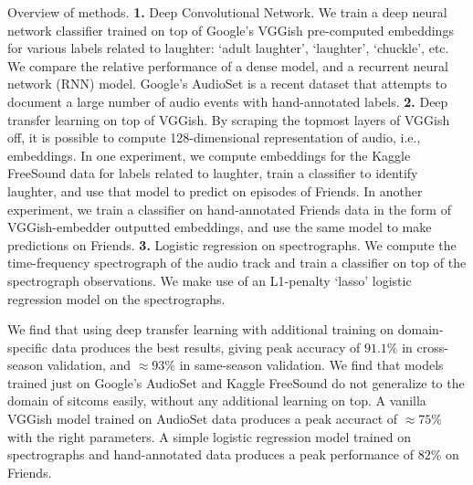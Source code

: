 \documentclass[12pt]{article}
\begin{document}
Overview of methods.
    \textbf{1.}
    Deep Convolutional Network. %
    We train a deep neural network classifier trained on top of Google's VGGish
        pre-computed embeddings for various labels related to laughter: `adult laughter',
    `laughter', `chuckle', etc. We compare the relative performance of a dense model,
        and a recurrent neural network (RNN) model.
    Google's AudioSet is a recent dataset that attempts to document a large number
        of audio events with hand-annotated labels.
    \textbf{2.}
    Deep transfer learning on top of VGGish.
    By scraping the topmost layers of VGGish off, it is possible to compute
        128-dimensional representation of audio, i.e., embeddings. 
        In one experiment,
        we compute embeddings for the Kaggle FreeSound data for labels related to laughter,
        train a classifier to identify laughter, and use that model to predict on episodes
        of Friends.
        In another experiment, we train a classifier on hand-annotated Friends data
        in the form of VGGish-embedder outputted embeddings, and use
        the same model to make predictions on Friends.
        \textbf{3.}
        Logistic regression on spectrographs.
        We compute the time-frequency spectrograph of the audio track and train
        a classifier on top of the spectrograph observations. We make use of an
        L1-penalty `lasso' logistic regression model on the spectrographs.

We find that using deep transfer learning with additional training on domain-specific data
produces the best results, giving peak accuracy of $91.1\%$ in cross-season validation, and
$\approx 93\%$ in same-season validation.
We find that models trained just on Google's AudioSet and Kaggle FreeSound do not generalize
to the domain of sitcoms easily, without any additional learning on top. A vanilla VGGish
model trained on AudioSet data produces a peak accuract of $\approx 75\%$ with the right
parameters.
A simple logistic regression model trained on spectrographs and hand-annotated data produces
a peak performance of $82\%$ on Friends.

\setlength{\intextsep}{1pt}
\end{document}
